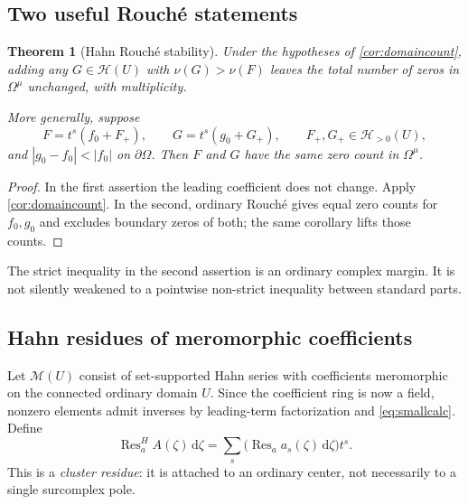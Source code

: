 \documentclass[11pt,oneside]{article}
\numberwithin{equation}{section}
\newtheorem{theorem}{Theorem}[section]
\theoremstyle{definition}
\theoremstyle{remark}\newtheorem{remark}[theorem]{Remark}
\newcommand{\HH}{\mathscr H}
\newcommand{\MM}{\mathscr M}
\newcommand{\Res}{\operatorname{Res}}
\newcommand{\dd}{\,\mathrm d}
\begin{document}
\subsection{Two useful Rouch\'e statements}
\begin{theorem}[Hahn Rouch\'e stability]\label{thm:rouche}
Under the hypotheses of \cref{cor:domaincount}, adding any
$G\in\HH(U)$ with $\nu(G)>\nu(F)$ leaves the total number of zeros in
$\Omega^\mu$ unchanged, with multiplicity.

More generally, suppose
\[
 F=t^s(f_0+F_+),\qquad G=t^s(g_0+G_+),\qquad
 F_+,G_+\in\HH_{>0}(U),
\]
and
$|g_0-f_0|<|f_0|$ on $\partial\Omega$. Then $F$ and $G$ have the same
zero count in $\Omega^\mu$.
\end{theorem}
\begin{proof}
In the first assertion the leading coefficient does not change. Apply
\cref{cor:domaincount}. In the second, ordinary Rouch\'e gives equal
zero counts for $f_0,g_0$ and excludes boundary zeros of both; the same
corollary lifts those counts.
\end{proof}
The strict inequality in the second assertion is an ordinary complex
margin. It is not silently weakened to a pointwise non-strict inequality
between standard parts.

\subsection{Hahn residues of meromorphic coefficients}
Let $\MM(U)$ consist of set-supported Hahn series with coefficients
meromorphic on the connected ordinary domain $U$. Since the coefficient
ring is now a field, nonzero elements admit inverses by leading-term
factorization and \eqref{eq:smallcalc}. Define
\[
 \Res_a^H A(\zeta)\dd\zeta
   =\sum_s\bigl(\Res_a a_s(\zeta)\dd\zeta\bigr)t^s.
\]
This is a \emph{cluster residue}: it is attached to an ordinary center,
not necessarily to a single surcomplex pole.
\end{document}
